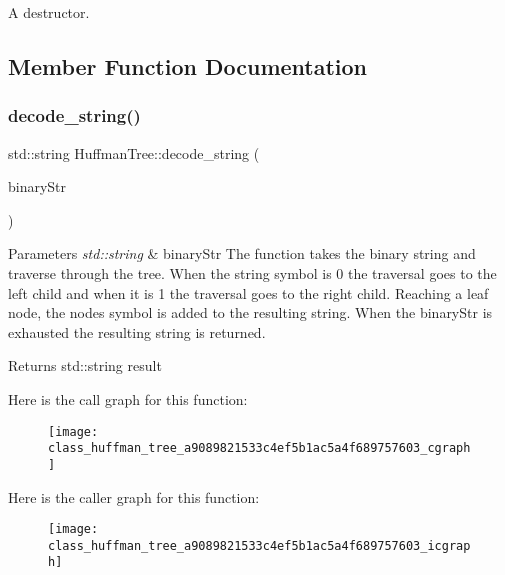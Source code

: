 A destructor. 

\subsection{Member Function Documentation}
\mbox{\label{class_huffman_tree_a9089821533c4ef5b1ac5a4f689757603}} 
\subsubsection{\texorpdfstring{decode\+\_\+string()}{decode\_string()}}
{\footnotesize\ttfamily std\+::string Huffman\+Tree\+::decode\+\_\+string (\begin{DoxyParamCaption}\item[{const std\+::string \&}]{binary\+Str }\end{DoxyParamCaption})}


\begin{DoxyParams}{Parameters}
{\em std\+::string} & binary\+Str The function takes the binary string and traverse through the tree. When the string symbol is \textquotesingle{}0\textquotesingle{} the traversal goes to the left child and when it is \textquotesingle{}1\textquotesingle{} the traversal goes to the right child. Reaching a leaf node, the node\textquotesingle{}s symbol is added to the resulting string. When the binary\+Str is exhausted the resulting string is returned. \\
\hline
\end{DoxyParams}
\begin{DoxyReturn}{Returns}
std\+::string result 
\end{DoxyReturn}
Here is the call graph for this function\+:\nopagebreak
\begin{figure}[H]
\begin{center}
\leavevmode
\texttt{[image: class\_huffman\_tree\_a9089821533c4ef5b1ac5a4f689757603\_cgraph]}
\end{center}
\end{figure}
Here is the caller graph for this function\+:\nopagebreak
\begin{figure}[H]
\begin{center}
\leavevmode
\texttt{[image: class\_huffman\_tree\_a9089821533c4ef5b1ac5a4f689757603\_icgraph]}
\end{center}
\end{figure}
\mbox{\label{class_huffman_tree_acf3a39b33e82f22f88436e6b99809761}} 
